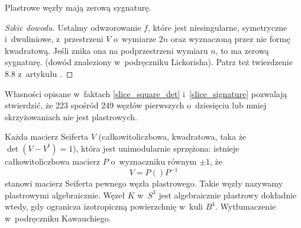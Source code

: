
\begin{proposition} \label{slice_signature}
    Plastrowe węzły mają zerową sygnaturę.
\end{proposition}

\begin{proof}[Szkic dowodu]
    Ustalmy odwzorowanie $f$, które jest niesingularne, symetryczne i~dwuliniowe, z~przestrzeni $V$ o~wymiarze $2n$ oraz wyznaczoną przez nie formę kwadratową.
    Jeśli znika ona na podprzestrzeni wymiaru $n$, to ma zerową sygnaturę.
    (dowód znaleziony w~podręczniku Lickorisha).
    Patrz też twierdzenie 8.8 z~artykułu \cite{murasugi65}.
\end{proof}

Własności opisane w~faktach \ref{slice_square_det} i~\ref{slice_signature} pozwalają stwierdzić, że 223 spośród 249 węzłów pierwszych o~dziesięciu lub mniej skrzyżowaniach nie jest plastrowych.

Każda macierz Seiferta $V$ (całkowitoliczbowa, kwadratowa, taka że $\det (V - V^t) = 1$), która jest unimodularnie sprzężona: istnieje całkowitoliczbowa macierz $P$ o~wyznaczniku równym $\pm 1$, że
\[
    V = P () P^{-1}
\]
stanowi macierz Seiferta pewnego węzła plastrowego.
Takie węzły nazywamy plastrowymi algebraicznie.
Węzeł $K$ w~$S^3$ jest algebraicznie plastrowy dokładnie wtedy, gdy ogranicza izotropiczną powierzchnię w~kuli $B^4$.
Wytłumaczenie w~podręczniku Kawauchiego.


